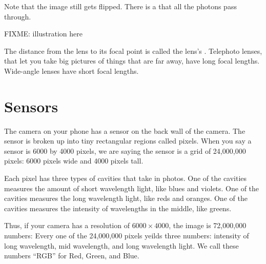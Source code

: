 Note that the image still gets flipped.  There is a  that all the photons pass through.

FIXME: illustration here

The distance from the lens to its focal point is called the lens's
. Telephoto lenses, that let you take big
pictures of things that are far away, have long focal lengths.
Wide-angle lenses have short focal lengths.

\section{Sensors}

The camera on your phone has a sensor on the back wall of the
camera. The sensor is broken up into tiny rectangular regions called
pixels.  When you say a sensor is 6000 by 4000 pixels, we are saying
the sensor is a grid of 24,000,000 pixels: 6000 pixels wide and
4000 pixels tall.

Each pixel has three types of cavities that take in photos. One of the
cavities measures the amount of short wavelength light, like blues and
violets. One of the cavities measures the long wavelength light, like
reds and oranges. One of the cavities measures the intensity of
wavelengths in the middle, like greens.

Thus, if your camera has a resolution of $6000 \times 4000$, the image
is 72,000,000 numbers: Every one of the 24,000,000 pixels yeilds three
numbers: intensity of long wavelength, mid wavelength, and long
wavelength light. We call these numbers ``RGB'' for Red, Green, and
Blue.




